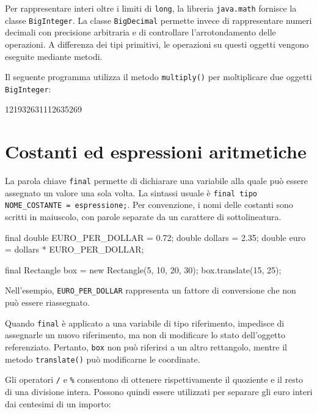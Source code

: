 Per rappresentare interi oltre i limiti di \texttt{long},
la libreria \texttt{java.math} fornisce la classe
\texttt{BigInteger}. La classe \texttt{BigDecimal} permette
invece di rappresentare numeri decimali con precisione
arbitraria e di controllare l'arrotondamento delle operazioni.
A differenza dei tipi primitivi, le operazioni su questi
oggetti vengono eseguite mediante metodi.

Il seguente programma utilizza il metodo
\texttt{multiply()} per moltiplicare due oggetti
\texttt{BigInteger}:



\begin{unipdterminal}
121932631112635269
\end{unipdterminal}

\clearpage

\section{Costanti ed espressioni aritmetiche}
\label{sec:fi-java-costanti-aritmetica}

La parola chiave \texttt{final} permette di dichiarare una
variabile alla quale può essere assegnato un valore una sola
volta. La sintassi usuale è
\texttt{final tipo NOME\_COSTANTE = espressione;}.
Per convenzione, i nomi delle costanti sono scritti in
maiuscolo, con parole separate da un carattere di sottolineatura.

\begin{unipdcode}[language=Java]
final double EURO_PER_DOLLAR = 0.72;
double dollars = 2.35;
double euro = dollars * EURO_PER_DOLLAR;

final Rectangle box = new Rectangle(5, 10, 20, 30);
box.translate(15, 25);
\end{unipdcode}

Nell'esempio, \texttt{EURO\_PER\_DOLLAR} rappresenta
un fattore di conversione che non può essere riassegnato.

Quando \texttt{final} è applicato a una variabile di
tipo riferimento, impedisce di assegnarle un nuovo riferimento,
ma non di modificare lo stato dell'oggetto referenziato.
Pertanto, \texttt{box} non può riferirsi a un altro
rettangolo, mentre il metodo \texttt{translate()}
può modificarne le coordinate.

Gli operatori \texttt{/} e \texttt{\%} consentono
di ottenere rispettivamente il quoziente e il resto
di una divisione intera. Possono quindi essere utilizzati
per separare gli euro interi dai centesimi di un importo:

